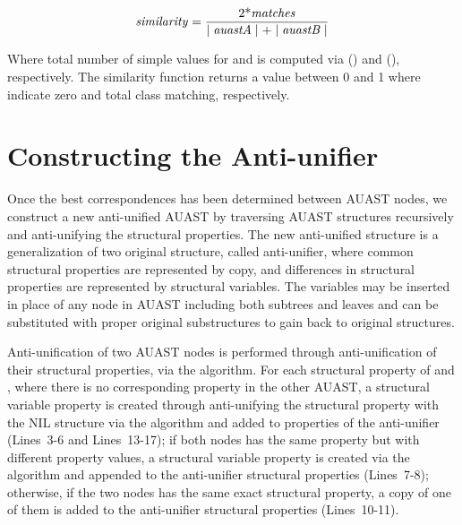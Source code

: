 \begin{equation}\label{eq1}
\mbox{\textit{similarity}} = \frac{\mbox{2*\textit{matches}}}{\mid \mbox{\textit{auastA}} \mid + \mid \mbox{\textit{auastB}} \mid}
\end{equation}

Where total number of simple values for  and  is computed via () and (), respectively. The similarity function returns a value between 0 and 1 where indicate zero and total class matching, respectively.


\section{Constructing the Anti-unifier} \label{meth-antiUnifier}
Once the best correspondences has been determined between AUAST nodes, we construct a new anti-unified AUAST by traversing AUAST structures recursively and anti-unifying the structural properties. The new anti-unified structure is a generalization of two original structure, called anti-unifier, where common structural properties are represented by copy, and differences in structural properties are represented by structural variables. The variables may be inserted in place of any node in AUAST including both subtrees and leaves and can be substituted with proper original substructures to gain back to original structures.

Anti-unification of two AUAST nodes is performed through anti-unification of their structural properties, via the  algorithm. For each structural property of  and , where there is no corresponding property in the other AUAST, a structural variable property is created through anti-unifying the structural property with the NIL structure via the  algorithm and added to properties of the anti-unifier (Lines~3-6 and Lines~13-17); if both nodes has the same property but with different property values, a structural variable property is created via the  algorithm and appended to the anti-unifier structural properties (Lines~7-8); otherwise, if the two nodes has the same exact structural property, a copy of one of them is added to the anti-unifier structural properties (Lines~10-11).


